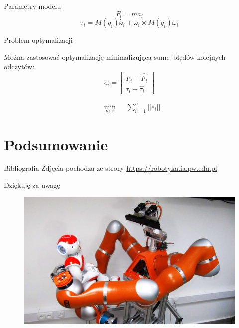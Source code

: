 \documentclass{beamer}
\begin{document}
\begin{frame}{Parametry modelu}
\begin{equation}
F_i = ma_i
\end{equation}
\begin{equation}
\tau_i = M(q_i)\dot{\omega_i} + \omega_i \times M(q_i)\omega_i
\end{equation}

\end{frame}

\begin{frame}{Problem optymalizacji}

Można zastosować optymalizację minimalizującą sumę błędów kolejnych odczytów:
\begin{equation}
e_i = \begin{bmatrix}
F_i - \hat{F_i}\\
\tau_i - \hat{\tau_i} 
\end{bmatrix}
\end{equation}

\begin{equation}
\begin{aligned}
& \underset{m, r}{\text{min}}
& & \sum_{i = 1}^{n} || e_i ||
\end{aligned}
\end{equation}

\end{frame}


%
%
\section{Podsumowanie}
\begin{frame}{Bibliografia}
Zdjęcia pochodzą ze strony \url{https://robotyka.ia.pw.edu.pl}
\end{frame}
\begin{frame}{Dziękuję za uwagę}
\begin{figure}[h]
	\centering
	\includegraphics[scale=1.4]{velma3}
\end{figure}
\end{frame}
\end{document}
